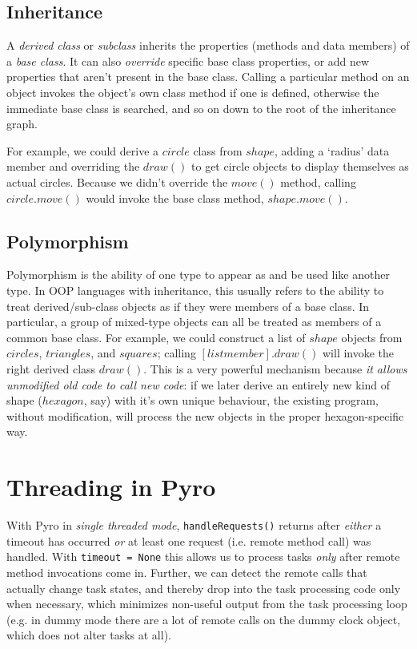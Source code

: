 \documentclass[11pt,a4paper]{article}
\begin{document}
\subsection{Inheritance}

A {\em derived class} or {\em subclass} inherits the properties (methods
and data members) of a {\em base class}. It can also {\em override}
specific base class properties, or add new properties that aren't
present in the base class. Calling a particular method on an object
invokes the object's own class method if one is defined, otherwise the
immediate base class is searched, and so on down to the root of the
inheritance graph. 

For example, we could derive a $circle$ class from $shape$, adding a
`radius' data member and overriding the $draw()$ to get circle objects
to display themselves as actual circles.  Because we didn't override the
$move()$ method, calling $circle.move()$ would invoke the base class
method, $shape.move()$. 


\subsection{Polymorphism}

Polymorphism is the ability of one type to appear as and be used like
another type.  In OOP languages with inheritance, this usually refers to
the ability to treat derived/sub-class objects as if they were members
of a base class.  In particular, a group of mixed-type objects can all
be treated as members of a common base class. For example, we could
construct a list of $shape$ objects from $circles$, $triangles$, and
$squares$; calling $[list member].draw()$ will invoke the right derived
class $draw()$. This is a very powerful mechanism because {\em it allows
unmodified old code to call new code}: if we later derive an entirely
new kind of shape ($hexagon$, say) with it's own unique behaviour, the
existing program, without modification, will process the new objects in
the proper hexagon-specific way.


\section{Threading in Pyro} \label{pyro-appendix}

With Pyro in {\em single threaded mode}, \verb#handleRequests()# returns
after {\em either} a timeout has occurred {\em or} at least one request
(i.e.  remote method call) was handled. With \verb#timeout = None# this
allows us to process tasks {\em only} after remote method invocations
come in.  Further, we can detect the remote calls that actually change
task states, and thereby drop into the task processing code only when
necessary, which minimizes non-useful output from the task processing
loop (e.g. in dummy mode there are a lot of remote calls on the dummy
clock object, which does not alter tasks at all). 
\end{document}
